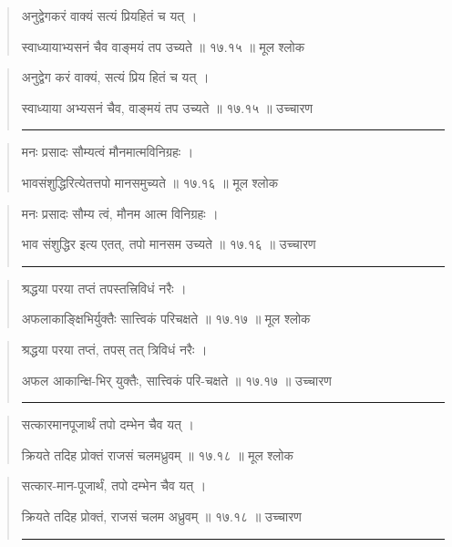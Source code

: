\begin{quotation}

अनुद्वेगकरं वाक्यं सत्यं प्रियहितं च यत्‌ ।  

स्वाध्यायाभ्यसनं चैव वाङ्‍मयं तप उच्यते  ॥ १७.१५ ॥  मूल श्लोक
\end{quotation}

\begin{quotation}

अनुद्वेग करं वाक्यं, सत्यं प्रिय हितं च यत्‌ ।  

स्वाध्याया अभ्यसनं चैव, वाङ्‍मयं तप उच्यते  ॥ १७.१५ ॥  उच्चारण

\noindent\rule{16cm}{0.4pt} 
\end{quotation}


\begin{quotation}

मनः प्रसादः सौम्यत्वं मौनमात्मविनिग्रहः ।  

भावसंशुद्धिरित्येतत्तपो मानसमुच्यते  ॥ १७.१६ ॥  मूल श्लोक
\end{quotation}

\begin{quotation}

मनः प्रसादः सौम्य त्वं, मौनम आत्म विनिग्रहः ।  

भाव संशुद्धिर इत्य एतत्, तपो मानसम उच्यते  ॥ १७.१६ ॥  उच्चारण

\noindent\rule{16cm}{0.4pt} 
\end{quotation}


\begin{quotation}

श्रद्धया परया तप्तं तपस्तत्त्रिविधं नरैः ।  

अफलाकाङ्क्षिभिर्युक्तैः सात्त्विकं परिचक्षते  ॥ १७.१७ ॥  मूल श्लोक
\end{quotation}

\begin{quotation}
श्रद्धया परया तप्तं, तपस् तत् त्रिविधं नरैः ।  

अफल आकान्क्षि-भिर् युक्तैः, सात्त्विकं परि-चक्षते  ॥ १७.१७ ॥  उच्चारण

\noindent\rule{16cm}{0.4pt} 
\end{quotation}


\begin{quotation}

सत्कारमानपूजार्थं तपो दम्भेन चैव यत्‌ ।  

क्रियते तदिह प्रोक्तं राजसं चलमध्रुवम्‌  ॥ १७.१८ ॥  मूल श्लोक
\end{quotation}

\begin{quotation}

सत्कार-मान-पूजार्थं, तपो दम्भेन चैव यत्‌ ।  

क्रियते तदिह प्रोक्तं, राजसं चलम अध्रुवम्‌  ॥ १७.१८ ॥  उच्चारण

\noindent\rule{16cm}{0.4pt} 
\end{quotation}


